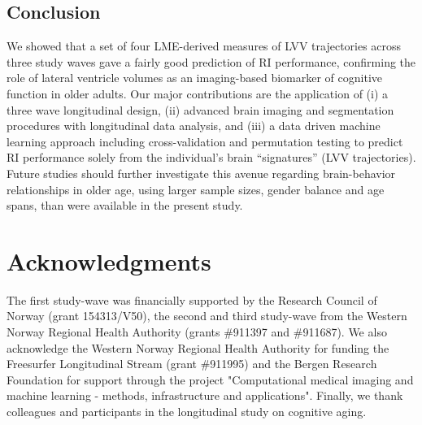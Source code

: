 \documentclass[10pt,letterpaper]{article}
\begin{document}
\subsection{Conclusion}We showed that a set of four LME-derived measures of LVV trajectories across three study waves gave a fairly good prediction of RI performance, confirming the role of lateral ventricle volumes as an imaging-based biomarker of cognitive function in older adults. 
Our major contributions are the application of (i) a three wave longitudinal design, (ii) advanced brain imaging and segmentation procedures with longitudinal data analysis, and (iii) a data driven machine learning approach including cross-validation and permutation testing to predict RI performance solely from the individual's brain ``signatures” (LVV trajectories). Future studies should further investigate this avenue
regarding brain-behavior relationships in older age, using larger
sample sizes, gender balance and age spans, than were available in the present study. \\


\section*{Acknowledgments}
The first study-wave was financially supported by the Research Council of Norway (grant 154313/V50), the second and third study-wave from the Western Norway Regional Health Authority (grants \#911397 and \#911687). We also acknowledge the Western Norway Regional Health Authority for funding the Freesurfer Longitudinal Stream (grant \#911995) and the Bergen Research Foundation for support through the project  "Computational medical imaging and machine learning - methods, infrastructure and applications". Finally, we thank colleagues and participants in the longitudinal study on cognitive aging.
\nolinenumbers
\end{document}
